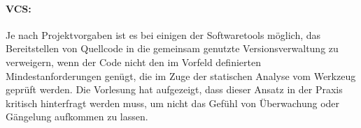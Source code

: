 \paragraph{VCS:} Je nach Projektvorgaben ist es bei einigen der Softwaretools möglich, das Bereitstellen von Quellcode in die gemeinsam genutzte Versionsverwaltung zu verweigern, wenn der Code nicht den im Vorfeld definierten Mindestanforderungen genügt, die im Zuge der statischen Analyse vom Werkzeug geprüft werden. Die Vorlesung hat aufgezeigt, dass dieser Ansatz in der Praxis kritisch hinterfragt werden muss, um nicht das Gefühl von Überwachung oder Gängelung aufkommen zu lassen.
